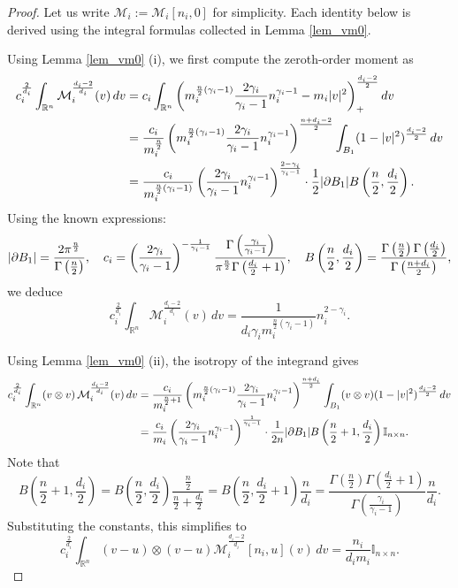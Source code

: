 \documentclass[10pt,a4paper]{amsart}
\newcommand{\pa}{\partial}
\begin{document}
 \begin{proof}
Let us write $\mathcal{M}_i := \mathcal{M}_i[n_i, 0]$ for simplicity. Each identity below is derived using the integral formulas collected in Lemma \ref{lem_vm0}.

Using Lemma \ref{lem_vm0} (i), we first compute the zeroth-order moment as
\begin{align*}
c_i^{\frac{2}{d_i}} \int_{\mathbb{R}^n} \mathcal{M}_i^{\frac{d_i - 2}{d_i}}(v)\, dv 
&= c_i \int_{\mathbb{R}^n} \left( m_i^{\frac{n}{2}(\gamma_i - 1)} \frac{2\gamma_i}{\gamma_i - 1} n_i^{\gamma_i - 1} - m_i |v|^2 \right)_+^{\frac{d_i - 2}{2}} dv \\
&= \frac{c_i}{m_i^{\frac{n}{2}}} \left( m_i^{\frac{n}{2}(\gamma_i - 1)} \frac{2\gamma_i}{\gamma_i - 1} n_i^{\gamma_i - 1} \right)^{\frac{n + d_i - 2}{2}} \int_{{\rm B}_1} (1 - |v|^2)^{\frac{d_i - 2}{2}}\, dv \\
&= \frac{c_i}{m_i^{\frac{n}{2}(\gamma_i - 1)}} \left( \frac{2\gamma_i}{\gamma_i - 1} n_i^{\gamma_i - 1} \right)^{\frac{2 - \gamma_i}{\gamma_i - 1}} \cdot \frac{1}{2} |\pa {\rm B}_1| B\left( \frac{n}{2}, \frac{d_i}{2} \right).
\end{align*}
Using the known expressions:
\[
|\pa {\rm B}_1| = \frac{2\pi^{\frac{n}{2}}}{\Gamma\left(\frac{n}{2}\right)}, \quad
c_i = \left( \frac{2\gamma_i}{\gamma_i - 1} \right)^{-\frac{1}{\gamma_i - 1}} \frac{\Gamma\left( \frac{\gamma_i}{\gamma_i - 1} \right)}{\pi^{\frac{n}{2}} \Gamma\left( \frac{d_i}{2} + 1 \right)}, \quad B\left( \frac{n}{2}, \frac{d_i}{2} \right) = \frac{\Gamma\left(\frac{n}{2}\right)\Gamma\left(\frac{d_i}{2}\right)}{\Gamma\left(\frac{n + d_i}{2}\right)},
\]
we deduce
\[
c_i^{\frac{2}{d_i}} \int_{\mathbb{R}^n} \mathcal{M}_i^{\frac{d_i - 2}{d_i}}(v)\, dv = \frac{1}{d_i \gamma_i m_i^{\frac{n}{2}(\gamma_i - 1)}} n_i^{2 - \gamma_i}.
\]
 

Using Lemma \ref{lem_vm0} (ii), the isotropy of the integrand gives
\begin{align*}
c_i^{\frac{2}{d_i}} \int_{\mathbb{R}^n} (v \otimes v) \, \mathcal{M}_i^{\frac{d_i - 2}{d_i}}(v)\, dv 
&= \frac{c_i}{m_i^{\frac{n}{2} + 1}} \left( m_i^{\frac{n}{2}(\gamma_i - 1)} \frac{2\gamma_i}{\gamma_i - 1} n_i^{\gamma_i - 1} \right)^{\frac{n + d_i}{2}} \int_{{\rm B}_1} (v \otimes v) (1 - |v|^2)^{\frac{d_i - 2}{2}}\, dv \\
&= \frac{c_i}{m_i} \left( \frac{2\gamma_i}{\gamma_i - 1} n_i^{\gamma_i - 1} \right)^{\frac{1}{\gamma_i - 1}} \cdot \frac{1}{2n} |\pa {\rm B}_1| B\left( \frac{n}{2} + 1, \frac{d_i}{2} \right) \mathbb{I}_{n \times n}.
\end{align*}
Note that 
\[
B\left(\frac n2+1,\frac {d_i}{2}\right)=B\left(\frac n2,\frac {d_i}{2}\right)\frac{\frac n2}{\frac n2+\frac {d_i}{2}}=B\left(\frac n2,\frac {d_i}{2}+1\right)\frac{n}{d_i}=\frac{\Gamma(\frac n2)\Gamma(\frac {d_i}{2}+1)}{\Gamma(\frac{\gamma_i}{\gamma_i-1})}\frac{n}{d_i}.
\]
Substituting the constants, this simplifies to
\[
c_i^{\frac{2}{d_i}} \int_{\mathbb{R}^n} (v - u) \otimes (v - u) \mathcal{M}_i^{\frac{d_i - 2}{d_i}}[n_i, u](v)\, dv = \frac{n_i}{d_i m_i} \mathbb{I}_{n \times n}.
\]


\end{proof}
\end{document}

